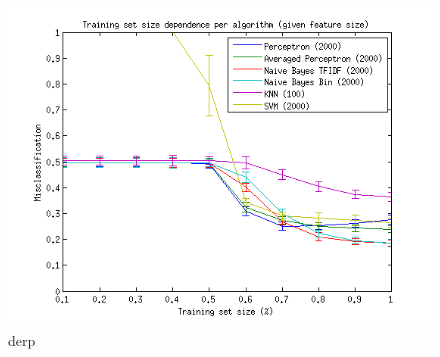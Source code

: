 \begin{figure}[H]
\centering
\includegraphics[scale = 0.5]{../Plottar/training_size_k_2000allknn_100.png}
\caption{derp}
\label{fig:trainingsize}
\end{figure} 
